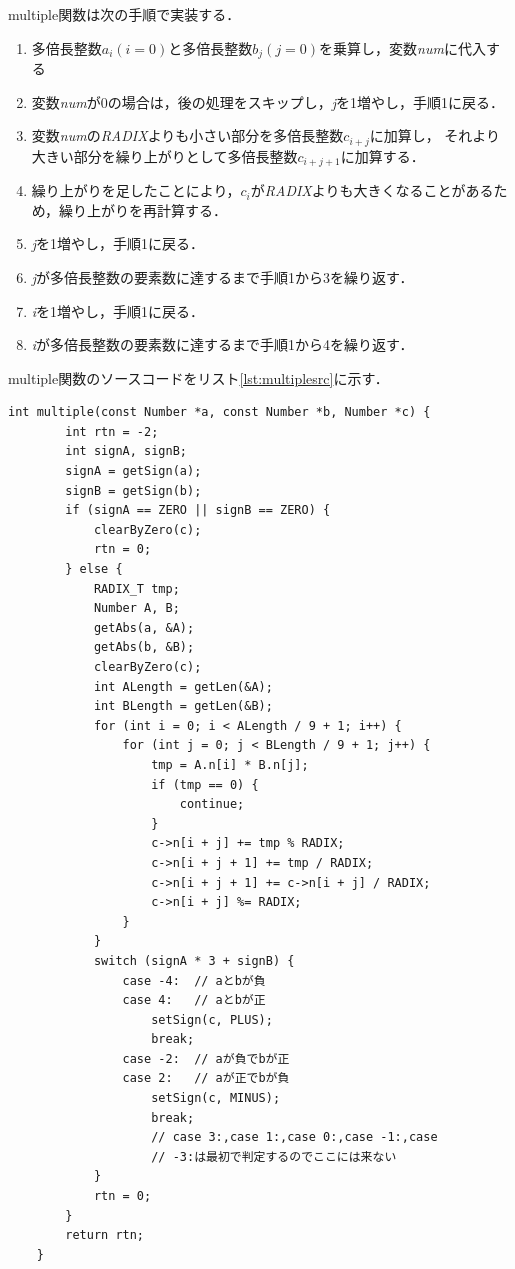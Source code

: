 \documentclass[a4paper,11pt,dvipdfmx]{jsarticle}
\begin{document}
multiple関数は次の手順で実装する．
\begin{enumerate}
    \item 多倍長整数$a_i(i = 0)$と多倍長整数$b_j(j = 0)$を乗算し，変数\textit{num}に代入する
    \item 変数\textit{num}が0の場合は，後の処理をスキップし，\textit{j}を1増やし，手順1に戻る．
    \item 変数\textit{num}の\textit{RADIX}よりも小さい部分を多倍長整数$c_{i+j}$に加算し，
    それより大きい部分を繰り上がりとして多倍長整数$c_{i+j+1}$に加算する．
    \item 繰り上がりを足したことにより，$c_i$が\textit{RADIX}よりも大きくなることがあるため，繰り上がりを再計算する．
    \item \textit{j}を1増やし，手順1に戻る．
    \item \textit{j}が多倍長整数の要素数に達するまで手順1から3を繰り返す．
    \item \textit{i}を1増やし，手順1に戻る．
    \item \textit{i}が多倍長整数の要素数に達するまで手順1から4を繰り返す．
\end{enumerate}

multiple関数のソースコードをリスト\ref{lst:multiplesrc}に示す．

\begin{lstlisting}[caption=\texttt{multiple}関数,label=lst:multiplesrc]
    int multiple(const Number *a, const Number *b, Number *c) {
        int rtn = -2;
        int signA, signB;
        signA = getSign(a);
        signB = getSign(b);
        if (signA == ZERO || signB == ZERO) {
            clearByZero(c);
            rtn = 0;
        } else {
            RADIX_T tmp;
            Number A, B;
            getAbs(a, &A);
            getAbs(b, &B);
            clearByZero(c);
            int ALength = getLen(&A);
            int BLength = getLen(&B);
            for (int i = 0; i < ALength / 9 + 1; i++) {
                for (int j = 0; j < BLength / 9 + 1; j++) {
                    tmp = A.n[i] * B.n[j];
                    if (tmp == 0) {
                        continue;
                    }
                    c->n[i + j] += tmp % RADIX;
                    c->n[i + j + 1] += tmp / RADIX;
                    c->n[i + j + 1] += c->n[i + j] / RADIX;
                    c->n[i + j] %= RADIX;
                }
            }
            switch (signA * 3 + signB) {
                case -4:  // aとbが負
                case 4:   // aとbが正
                    setSign(c, PLUS);
                    break;
                case -2:  // aが負でbが正
                case 2:   // aが正でbが負
                    setSign(c, MINUS);
                    break;
                    // case 3:,case 1:,case 0:,case -1:,case
                    // -3:は最初で判定するのでここには来ない
            }
            rtn = 0;
        }
        return rtn;
    }
\end{lstlisting}
\end{document}
